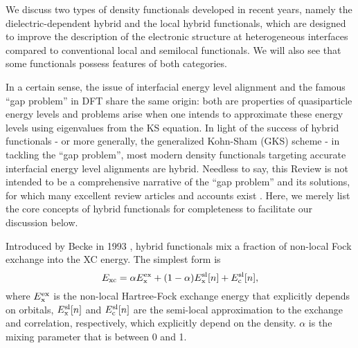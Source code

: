 \documentclass[aip, amsmath, amssymb, reprint, longbibliography]{revtex4-2}
\begin{document}
We discuss two types of density functionals developed in recent years, namely the dielectric-dependent hybrid and the local hybrid functionals, which are designed to improve the description of the electronic structure at heterogeneous interfaces compared to conventional local and semilocal functionals. We will also see that some functionals possess features of both categories.

In a certain sense, the issue of interfacial energy level alignment and the famous ``gap problem'' in DFT \cite{PPLB82} share the same origin: both are properties of quasiparticle energy levels and problems arise when one intends to approximate these energy levels using eigenvalues from the KS equation. In light of the success of hybrid functionals - or more generally, the generalized Kohn-Sham (GKS) scheme \cite{SGVM96} - in tackling the ``gap problem'', most modern density functionals targeting accurate interfacial energy level alignments are hybrid. Needless to say, this Review is not intended to be a comprehensive narrative of the ``gap problem'' and its solutions, for which many excellent review articles and accounts exist \cite{YCM12,PYBY17,PR18}. Here, we merely list the core concepts of hybrid functionals for completeness to facilitate our discussion below.

Introduced by Becke in 1993 \cite{B93}, hybrid functionals mix a fraction of non-local Fock exchange into the XC energy. The simplest form is
\begin{equation}
E_{\rm xc}=\alpha E_{\rm x}^{\rm ex}+(1-\alpha)E_{\rm x}^{\rm sl}[n]+E_{\rm c}^{\rm sl}[n],
\label{eq:hyb}
\end{equation}
where $E_{\rm x}^{\rm ex}$ is the non-local Hartree-Fock exchange energy that explicitly depends on orbitals, $E_{\rm x}^{\rm sl}[n]$ and $E_{\rm c}^{\rm sl}[n]$ are the semi-local approximation to the exchange and correlation, respectively, which explicitly depend on the density. $\alpha$ is the mixing parameter that is between 0 and 1.
\end{document}
